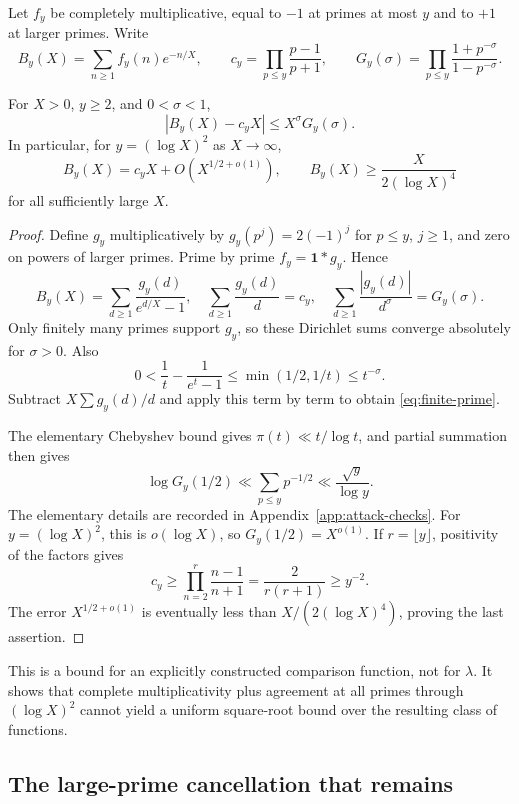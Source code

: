 Let \(f_y\) be completely multiplicative, equal to \(-1\) at primes
at most \(y\) and to \(+1\) at larger primes. Write
\[
 B_y(X)=\sum_{n\ge1}f_y(n)e^{-n/X},\qquad
 c_y=\prod_{p\le y}\frac{p-1}{p+1},\qquad
 G_y(\sigma)=\prod_{p\le y}
             \frac{1+p^{-\sigma}}{1-p^{-\sigma}}.
\]

\begin{theorem}\label{thm:finite-prime}
For \(X>0\), \(y\ge2\), and \(0<\sigma<1\),
\begin{equation}\label{eq:finite-prime}
 |B_y(X)-c_yX|\le X^\sigma G_y(\sigma).
\end{equation}
In particular, for \(y=(\log X)^2\) as \(X\to\infty\),
\[
 B_y(X)=c_yX+O(X^{1/2+o(1)}),\qquad
 B_y(X)\ge\frac{X}{2(\log X)^4}
\]
for all sufficiently large \(X\).
\end{theorem}
\begin{proof}
Define \(g_y\) multiplicatively by \(g_y(p^j)=2(-1)^j\)
for \(p\le y\), \(j\ge1\), and zero on powers of larger primes.
Prime by prime \(f_y=\mathbf1*g_y\). Hence
\[
 B_y(X)=\sum_{d\ge1}\frac{g_y(d)}{e^{d/X}-1},\quad
 \sum_{d\ge1}\frac{g_y(d)}d=c_y,\quad
 \sum_{d\ge1}\frac{|g_y(d)|}{d^\sigma}=G_y(\sigma).
\]
Only finitely many primes support \(g_y\), so these Dirichlet sums
converge absolutely for \(\sigma>0\). Also
\[
 0<\frac1t-\frac1{e^t-1}
 \le\min(1/2,1/t)\le t^{-\sigma}.
\]
Subtract \(X\sum g_y(d)/d\) and apply this term by term to obtain
\eqref{eq:finite-prime}.

The elementary Chebyshev bound gives
\(\pi(t)\ll t/\log t\), and partial summation then gives
\[
 \log G_y(1/2)\ll\sum_{p\le y}p^{-1/2}
                 \ll\frac{\sqrt y}{\log y}.
\]
The elementary details are recorded in Appendix~\ref{app:attack-checks}.
For \(y=(\log X)^2\), this is \(o(\log X)\), so
\(G_y(1/2)=X^{o(1)}\).
If \(r=\lfloor y\rfloor\), positivity of the factors gives
\[
 c_y\ge\prod_{n=2}^r\frac{n-1}{n+1}
      =\frac2{r(r+1)}\ge y^{-2}.
\]
The error \(X^{1/2+o(1)}\) is eventually less than
\(X/(2(\log X)^4)\), proving the last assertion.
\end{proof}

This is a bound for an explicitly constructed comparison function,
not for \(\lambda\). It shows that complete multiplicativity plus
agreement at all primes through \((\log X)^2\) cannot yield a
uniform square-root bound over the resulting class of functions.

\subsection{The large-prime cancellation that remains}

